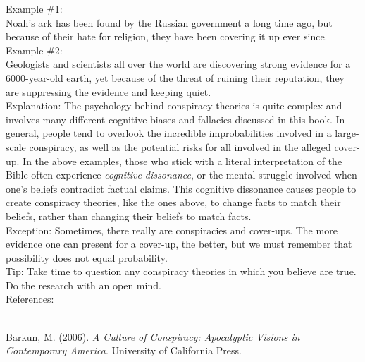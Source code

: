 \documentclass[a4paper,12pt,single,pdftex]{scrbook}
\begin{document}
    
      Example \#1:
    \\

    
      Noah’s ark has been found by the Russian government a long time ago, but because of their hate for religion, they have been covering it up ever since.
    \\

    
      Example \#2:
    \\

    
      Geologists and scientists all over the world are discovering strong evidence for a 6000-year-old earth, yet because of the threat of ruining their reputation, they are suppressing the evidence and keeping quiet.
    \\

    
      Explanation: The psychology behind conspiracy theories is quite complex and involves many different cognitive biases and fallacies discussed in this book.  In general, people tend to overlook the incredible improbabilities involved in a large-scale conspiracy, as well as the potential risks for all involved in the alleged cover-up.  In the above examples, those who stick with a literal interpretation of the Bible often experience {\it cognitive dissonance}, or the mental struggle involved when one’s beliefs contradict factual claims.  This cognitive dissonance causes people to create conspiracy theories, like the ones above, to change facts to match their beliefs, rather than changing their beliefs to match facts.
    \\

    
      Exception: Sometimes, there really are conspiracies and cover-ups.  The more evidence one can present for a cover-up, the better, but we must remember that possibility does not equal probability.
    \\

    
      Tip: Take time to question any conspiracy theories in which you believe are true.  Do the research with an open mind.
    \\

    References:

    
      
        
      \\

      
        
          Barkun, M. (2006). {\it A Culture of Conspiracy: Apocalyptic Visions in Contemporary America}. University of California Press.
        
      
    
\end{document}
